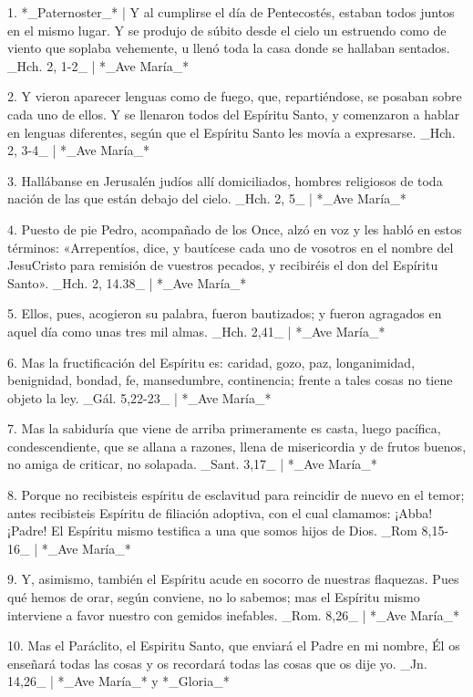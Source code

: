 1. *_Paternoster_* | Y al cumplirse el día de Pentecostés, estaban todos juntos en el mismo lugar. Y se produjo de súbito desde el cielo un estruendo como de viento que soplaba vehemente, u llenó toda la casa donde se hallaban sentados. _Hch. 2, 1-2_ | *_Ave María_*

2. Y vieron aparecer lenguas como de fuego, que, repartiéndose, se posaban sobre cada uno de ellos. Y se llenaron todos del Espíritu Santo, y comenzaron a hablar en lenguas diferentes, según que el Espíritu Santo les movía a expresarse. _Hch. 2, 3-4_ | *_Ave María_*

3. Hallábanse en Jerusalén judíos allí domiciliados, hombres religiosos de toda nación de las que están debajo del cielo. _Hch. 2, 5_ | *_Ave María_*

4. Puesto de pie Pedro, acompañado de los Once, alzó en voz y les habló en estos términos: «Arrepentíos, dice, y bautícese cada uno de vosotros en el nombre del JesuCristo para remisión de vuestros pecados, y recibiréis el don del Espíritu Santo». _Hch. 2, 14.38_ | *_Ave María_*

5. Ellos, pues, acogieron su palabra, fueron bautizados; y fueron agragados en aquel día como unas tres mil almas. _Hch. 2,41_ | *_Ave María_*

6. Mas la fructificación del Espíritu es: caridad, gozo, paz, longanimidad, benignidad, bondad, fe, mansedumbre, continencia; frente a tales cosas no tiene objeto la ley. _Gál. 5,22-23_ | *_Ave María_*

7. Mas la sabiduría que viene de arriba primeramente es casta, luego pacífica, condescendiente, que se allana a razones, llena de misericordia y de frutos buenos, no amiga de criticar, no solapada. _Sant. 3,17_ | *_Ave María_*

8. Porque no recibisteis espíritu de esclavitud para reincidir de nuevo en el temor; antes recibisteis Espíritu de filiación adoptiva, con el cual clamamos: ¡Abba!¡Padre! El Espíritu mismo testifica a una que somos hijos de Dios. _Rom 8,15-16_ | *_Ave María_*

9. Y, asimismo, también el Espíritu acude en socorro de nuestras flaquezas. Pues qué hemos de orar, según conviene, no lo sabemos; mas el Espíritu mismo interviene a favor nuestro con gemidos inefables. _Rom. 8,26_ | *_Ave María_*

10. Mas el Paráclito, el Espiritu Santo, que enviará el Padre en mi nombre, Él os enseñará todas las cosas y os recordará todas las cosas que os dije yo. _Jn. 14,26_ | *_Ave María_* y *_Gloria_*

